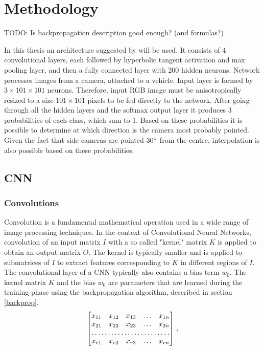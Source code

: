 \chapter{Methodology}

TODO: Is backpropagation description good enough? (and formulas?)

In this thesis an architecture suggested by \citeauthor{giusti2016machine} will be used. It consists of 4 convolutional layers, each followed by hyperbolic tangent activation and max pooling layer, and then a fully connected layer with 200 hidden neurons. Network processes images from a camera, attached to a vehicle. Input layer is formed by $3\times 101\times101$ neurons. Therefore, input \acs{RGB} image must be anisotropically resized to a size $101\times101$ pixels to be fed directly to the network. After going through all the hidden layers and the softmax output layer it produces 3 probabilities of each class, which sum to 1. Based on these probabilities it is possible to determine at which direction is the camera most probably pointed. Given the fact that side cameras are pointed $30 \degree$ from the centre, interpolation is also possible based on these probabilities.  


\section{CNN}
\subsection{Convolutions}

Convolution is a fundamental mathematical operation used in a wide range of image processing techniques. In the context of Convolutional Neural Networks, convolution of an input matrix $I$ with a so called "kernel" matrix $K$ is applied to obtain an output matrix $O$. The kernel is typically smaller and is applied to submatrices of $I$ to extract features corresponding to $K$ in different regions of $I$. The convolutional layer of a \acs{CNN} typically also contains a bias term $w_0$. The kernel matrix $K$ and the bias $w_0$ are parameters that are learned during the training phase using the backpropagation algorithm, described in section \ref{backprop}. 
\begin{equation}
	\begin{bmatrix}
    x_{11}       & x_{12} & x_{13} & \dots & x_{1n} \\
    x_{21}       & x_{22} & x_{23} & \dots & x_{2n} \\
    \hdotsfor{5} \\
    x_{r1}       & x_{r2} & x_{r3} & \dots & x_{rn}
\end{bmatrix}\,,
\label{Input data}
\end{equation}

